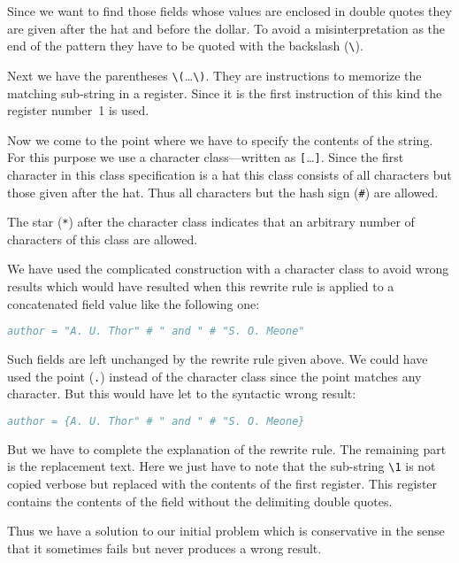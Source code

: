 \documentclass[11pt,a4paper]{scrbook}
\begin{document}
Since we want to find those fields whose values are enclosed in double quotes
they are given after the hat and before the dollar. To avoid a
misinterpretation as the end of the pattern they have to be quoted with the
backslash (\verb|\|).

Next we have the parentheses \verb|\(|\ldots\verb|\)|. They are instructions
to memorize the matching sub-string in a register. Since it is the first
instruction of this kind the register number~1 is used.

Now we come to the point where we have to specify the contents of the string.
For this purpose we use a character class---written as \verb|[|\ldots\verb|]|.
Since the first character in this class specification is a hat this class
consists of all characters but those given after the hat. Thus all characters
but the hash sign (\verb|#|\index{\#}) are allowed.

The star (\verb|*|\index{*}) after the character class indicates that an
arbitrary number of characters of this class are allowed.

We have used the complicated construction with a character class to avoid
wrong results which would have resulted when this rewrite rule is applied to a
concatenated field value like the following one:

\begin{lstlisting}[language=BibTeX]
  author = "A. U. Thor" # " and " # "S. O. Meone"
\end{lstlisting}

Such fields are left unchanged by the rewrite rule given above. We could have
used the point (\verb|.|) instead of the character class since the point
matches any character. But this would have let to the syntactic wrong result:
\begin{lstlisting}[language=BibTeX]
  author = {A. U. Thor" # " and " # "S. O. Meone}
\end{lstlisting}

But we have to complete the explanation of the rewrite rule. The remaining
part is the replacement text. Here we just have to note that the sub-string
\verb|\1| is not copied verbose but replaced with the contents of the first
register. This register contains the contents of the field without the
delimiting double quotes.

Thus we have a solution to our initial problem which is conservative in the
sense that it sometimes fails but never produces a wrong result.


\end{document}
